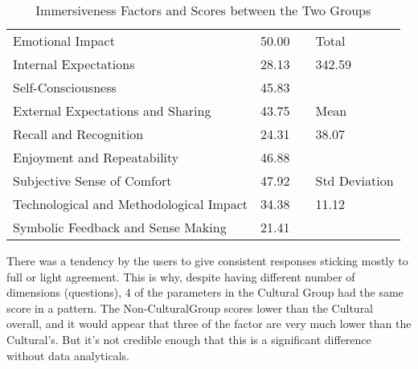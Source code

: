 \begin{table}[ht]
\begin{tabular}{llll}
    \multicolumn{1}{|l|}{Emotional Impact}                        & \multicolumn{1}{l|}{50.00} & \multicolumn{1}{l|}{} & \multicolumn{1}{l|}{Total}          \\ \cline{1-2} \cline{4-4} 
    \multicolumn{1}{|l|}{Internal Expectations}                   & \multicolumn{1}{l|}{28.13} & \multicolumn{1}{l|}{} & \multicolumn{1}{l|}{342.59}         \\ \cline{1-2} \cline{4-4} 
    \multicolumn{1}{|l|}{Self-Consciousness}                      & \multicolumn{1}{l|}{45.83} &                       &                                     \\ \cline{1-2} \cline{4-4} 
    \multicolumn{1}{|l|}{External Expectations and Sharing}       & \multicolumn{1}{l|}{43.75} & \multicolumn{1}{l|}{} & \multicolumn{1}{l|}{Mean}           \\ \cline{1-2} \cline{4-4} 
    \multicolumn{1}{|l|}{Recall and Recognition}                  & \multicolumn{1}{l|}{24.31} & \multicolumn{1}{l|}{} & \multicolumn{1}{l|}{38.07}          \\ \cline{1-2} \cline{4-4} 
    \multicolumn{1}{|l|}{Enjoyment and Repeatability}             & \multicolumn{1}{l|}{46.88} &                       &                                     \\ \cline{1-2} \cline{4-4} 
    \multicolumn{1}{|l|}{Subjective Sense of Comfort}             & \multicolumn{1}{l|}{47.92} & \multicolumn{1}{l|}{} & \multicolumn{1}{l|}{Std  Deviation} \\ \cline{1-2} \cline{4-4} 
    \multicolumn{1}{|l|}{Technological and Methodological Impact} & \multicolumn{1}{l|}{34.38} & \multicolumn{1}{l|}{} & \multicolumn{1}{l|}{11.12}          \\ \cline{1-2} \cline{4-4} 
    \multicolumn{1}{|l|}{Symbolic Feedback and Sense Making}      & \multicolumn{1}{l|}{21.41} &                       &                                     \\ \cline{1-2}
    \end{tabular}
        \caption{\label{tab:Table_Final}Immersiveness Factors and Scores between the Two Groups}
    \end{table}
    There was a tendency by the users to give consistent responses sticking mostly to full or light agreement. This is why, despite having different number of dimensions (questions), 4 of the parameters in the Cultural Group had the same score in a pattern. The Non-CulturalGroup scores lower than the Cultural overall, and it would appear that three of the factor are very much lower than the Cultural's. But it's not credible enough that this is a significant difference without data analyticals.\\
